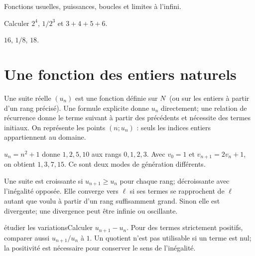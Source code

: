 \label{t11s-c12}
\begin{revision}Fonctions usuelles, puissances, boucles et limites à l’infini.\end{revision}
\begin{automatismes}\exo\label{t11s-c12-auto}Calculer $2^4$, $1/2^3$ et $3+4+5+6$.\end{automatismes}
\begin{corrige}\label{sol-t11s-c12-auto}$16$, $1/8$, $18$.\end{corrige}

\section{Une fonction des entiers naturels}
\begin{definition}Une suite réelle $(u_n)$ est une fonction définie sur $N$ (ou sur les entiers à partir d’un rang précisé). Une formule explicite donne $u_n$ directement; une relation de récurrence donne le terme suivant à partir des précédents et nécessite des termes initiaux. On représente les points $(n;u_n)$ : seuls les indices entiers appartiennent au domaine.\end{definition}
\begin{exemple}$u_n=n^2+1$ donne $1,2,5,10$ aux rangs $0,1,2,3$. Avec $v_0=1$ et $v_{n+1}=2v_n+1$, on obtient $1,3,7,15$. Ce sont deux modes de génération différents.\end{exemple}
\begin{definition}Une suite est croissante si $u_{n+1}\ge u_n$ pour chaque rang; décroissante avec l’inégalité opposée. Elle converge vers $\ell$ si ses termes se rapprochent de $\ell$ autant que voulu à partir d’un rang suffisamment grand. Sinon elle est divergente; une divergence peut être infinie ou oscillante.\end{definition}
\begin{methode}{étudier les variations}Calculer $u_{n+1}-u_n$. Pour des termes strictement positifs, comparer aussi $u_{n+1}/u_n$ à $1$. Un quotient n’est pas utilisable si un terme est nul; la positivité est nécessaire pour conserver le sens de l’inégalité.\end{methode}
